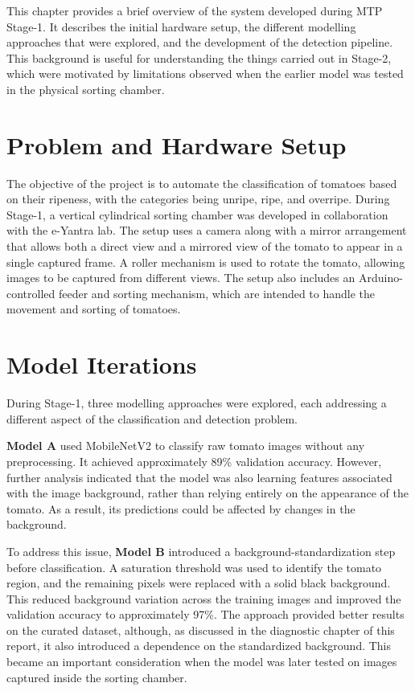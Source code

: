 \documentclass[12pt,a4paper]{report}
\begin{document}
This chapter provides a brief overview of the system developed during MTP Stage-1. It describes the initial hardware setup, the different modelling approaches that were explored, and the development of the detection pipeline. This background is useful for understanding the things carried out in Stage-2, which were motivated by limitations observed when the earlier model was tested in the physical sorting chamber.

\section{Problem and Hardware Setup}

The objective of the project is to automate the classification of tomatoes based on their ripeness, with the categories being unripe, ripe, and overripe. During Stage-1, a vertical cylindrical sorting chamber was developed in collaboration with the e-Yantra lab. The setup uses a camera along with a mirror arrangement that allows both a direct view and a mirrored view of the tomato to appear in a single captured frame. A roller mechanism is used to rotate the tomato, allowing images to be captured from different views. The setup also includes an Arduino-controlled feeder and sorting mechanism, which are intended to handle the movement and sorting of tomatoes.

\section{Model Iterations}

During Stage-1, three modelling approaches were explored, each addressing a different aspect of the classification and detection problem.

\textbf{Model A} used MobileNetV2 to classify raw tomato images without any preprocessing. It achieved approximately 89\% validation accuracy. However, further analysis indicated that the model was also learning features associated with the image background, rather than relying entirely on the appearance of the tomato. As a result, its predictions could be affected by changes in the background.

To address this issue, \textbf{Model B} introduced a background-standardization step before classification. A saturation threshold was used to identify the tomato region, and the remaining pixels were replaced with a solid black background. This reduced background variation across the training images and improved the validation accuracy to approximately 97\%. The approach provided better results on the curated dataset, although, as discussed in the diagnostic chapter of this report, it also introduced a dependence on the standardized background. This became an important consideration when the model was later tested on images captured inside the sorting chamber.
\end{document}
